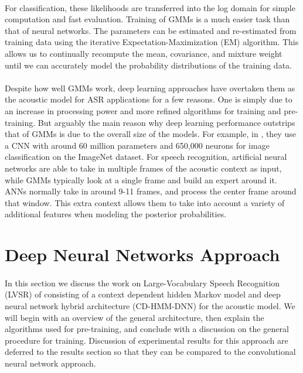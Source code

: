 \documentclass[letterpaper]{article}
\begin{document}
\paragraph{} For classification, these likelihoods are transferred into the log domain for simple computation and fast evaluation. Training of GMMs is a much easier task than that of neural networks. The parameters can be estimated and re-estimated from training data using the iterative Expectation-Maximization (EM) algorithm. This allows us to continually recompute the mean, covariance, and mixture weight until we can accurately model the probability distributions of the training data.

\paragraph{} Despite how well GMMs work, deep learning approaches have overtaken them as the acoustic model for ASR applications for a few reasons. One is simply due to an increase in processing power and more refined algorithms for training and pre-training. But arguably the main reason why deep learning performance outstrips that of GMMs is due to the overall size of the models. For example, in \cite{DBLP:conf/nips/KrizhevskySH12}, they use a CNN with around 60 million parameters and 650,000 neurons for image classification on the ImageNet dataset. For speech recognition, artificial neural networks are able to take in multiple frames of the acoustic context as input, while GMMs typically look at a single frame and build an expert around it. ANNs normally take in around 9-11 frames, and process the center frame around that window. This extra context allows them to take into account a variety of additional features when modeling the posterior probabilities. 

\section*{Deep Neural Networks Approach} 

\paragraph{} In this section we discuss the work on Large-Vocabulary Speech Recognition (LVSR) of \cite{DBLP:journals/taslp/DahlYDA12} consisting of a context dependent hidden Markov model and deep neural network hybrid architecture (CD-HMM-DNN) for the acoustic model. We will begin with an overview of the general architecture, then explain the algorithms used for pre-training, and conclude with a discussion on the general procedure for training. Discussion of experimental results for this approach are deferred to the results section so that they can be compared to the convolutional neural network approach.
\end{document}
